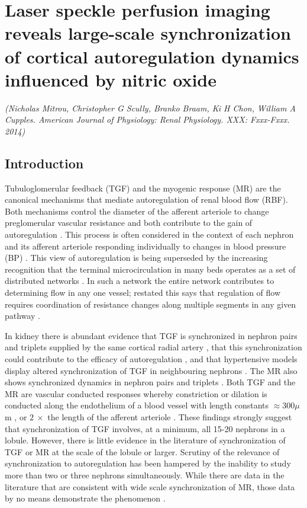 \chapter{Laser speckle perfusion imaging reveals large-scale synchronization of cortical autoregulation dynamics influenced by nitric oxide}

\small{\textit{(Nicholas Mitrou, Christopher G Scully, Branko Braam, Ki H Chon, William A Cupples. American Journal of Physiology: Renal Physiology. XXX: Fxxx-Fxxx. 2014)}}

\section{Introduction}

Tubuloglomerular feedback (TGF) and the myogenic response (MR) are the canonical
mechanisms that mediate autoregulation of renal blood flow (RBF). Both mechanisms control the
diameter of the afferent arteriole to change preglomerular vascular resistance and both contribute to the gain of autoregulation \cite{Hayashi89,Just98,Persson82}. This process is often considered in the context of each nephron and its afferent arteriole responding individually to changes in blood pressure (BP) \cite{GuytonHall}. This view of autoregulation is being superseded by the increasing recognition that the terminal microcirculation in many beds operates as a set of distributed networks \cite{Krupatkin10}. In such a network the entire network contributes to determining flow in any one vessel; restated this says that regulation of flow requires coordination of resistance changes along multiple segments in any given pathway \cite{Mahmud13}.

	In kidney there is abundant evidence that TGF is synchronized in nephron pairs and triplets supplied by the same cortical radial artery \cite{HolsteinRathlou87}, that this synchronization could contribute to the efficacy of autoregulation \cite{Kallskog90}, and that hypertensive models  display altered synchronization of TGF in neighbouring nephrons \cite{Yip92,Chen95}. The MR also shows synchronized dynamics in nephron pairs and triplets \cite{Sosnovtseva07}. Both TGF \cite{Wagner97} and the MR \cite{Rivers95} are vascular conducted responses whereby constriction or dilation is conducted along the endothelium of a blood vessel with length constants $\approx 300 \mu$m \cite{Wagner97}, or $2 \ \times$ the length of the afferent arteriole \cite{Casellas94}. These findings strongly suggest that synchronization of TGF involves, at a minimum, all 15-20 nephrons in a lobule. However, there is little evidence in the literature of synchronization of TGF or MR at the scale of the lobule or larger. Scrutiny of the relevance of synchronization to autoregulation has been hampered by the inability to study more than two or three nephrons simultaneously. While there are data in the literature that are consistent with wide scale synchronization of MR, those data by no means demonstrate the phenomenon \cite{Cupples96}.
	
